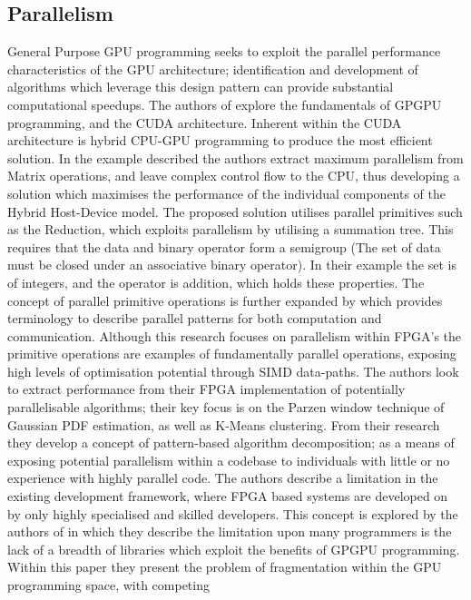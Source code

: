 \subsection{Parallelism}
General Purpose GPU programming seeks to exploit the parallel performance characteristics of the GPU
architecture; identification and development of algorithms which leverage this design pattern can
provide substantial computational speedups. The authors of \cite{papadrakakis2011new} explore the
fundamentals of GPGPU programming, and the CUDA architecture. Inherent within the CUDA architecture
is hybrid CPU-GPU programming to produce the most efficient solution. In the example described the
authors extract maximum parallelism from Matrix operations, and leave complex control flow to the
CPU, thus developing a solution which maximises the performance of the individual components of the
Hybrid Host-Device model. The proposed solution utilises parallel primitives such as the Reduction,
which exploits parallelism by utilising a summation tree. This requires that the data and binary
operator form a semigroup (The set of data must be closed under an associative binary operator). In
their example the set is of integers, and the operator is addition, which holds these properties.
The concept of parallel primitive operations is further expanded by \cite{nagarajan2011accelerating}
which provides terminology to describe parallel patterns for both computation and communication.
Although this research focuses on parallelism within FPGA’s the primitive operations are examples of
fundamentally parallel operations, exposing high levels of optimisation potential through SIMD
data-paths. The authors look to extract performance from their FPGA implementation of potentially
parallelisable algorithms; their key focus is on the Parzen window technique of Gaussian PDF
estimation, as well as K-Means clustering. From their research they develop a concept of
pattern-based algorithm decomposition; as a means of exposing potential parallelism within a
codebase to individuals with little or no experience with highly parallel code.  The authors
describe a limitation in the existing development framework, where FPGA based systems are developed
on by only highly specialised and skilled developers. This concept is explored by the authors of
\cite{sengupta2007scan} in which they describe the limitation upon many programmers is
the lack of a breadth of libraries which exploit the benefits of GPGPU programming.  Within this
paper they present the problem of fragmentation within the GPU programming space, with competing
